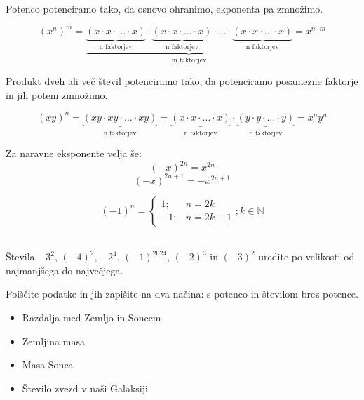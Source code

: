             Potenco potenciramo tako, da osnovo ohranimo, ekponenta pa zmnožimo.

            $$ (x^n)^m=\underbrace{\underbrace{(x\cdot x\cdot\ldots\cdot x)}_\text{n faktorjev}\cdot\underbrace{(x\cdot x\cdot\ldots\cdot x)}_\text{n faktorjev}\cdot\ldots\cdot\underbrace{(x\cdot x\cdot\ldots\cdot x)}_\text{n faktorjev}}_\text{m faktorjev}=x^{n\cdot m}$$
            
    

    
            Produkt dveh ali več števil potenciramo tako, da potenciramo posamezne faktorje in jih potem zmnožimo.

            $$ (xy)^n =\underbrace{(xy\cdot xy\cdot\ldots\cdot xy)}_\text{n faktorjev}=\underbrace{(x\cdot x\cdot\ldots\cdot x)}_\text{n faktorjev}\cdot\underbrace{(y\cdot y\cdot\ldots\cdot y)}_\text{n faktorjev}=x^n y^n$$
            

            Za naravne eksponente velja še:
            $$(-x)^{2n}=x^{2n}$$
            $$(-x)^{2n+1}=-x^{2n+1}$$

            $$(-1)^n=\begin{cases}
                1; &n=2k \\
                -1; &n=2k-1
            \end{cases}; k\in\mathbb{N}$$
\newline ~\newline
            \newpage

            \begin{naloga}
                    Števila $-3^2$, $(-4)^2$, $-2^4$, $(-1)^{2024}$, $(-2)^3$ in $(-3)^2$ uredite po velikosti od najmanjšega do največjega. 
            \end{naloga}

                \begin{naloga}
                    Poiščite podatke in jih zapišite na dva načina: s potenco in številom brez potence.
                    \begin{itemize}
                        \item Razdalja med Zemljo in Soncem
                        \item Zemljina masa
                        \item Masa Sonca
                        \item Število zvezd v naši Galaksiji
                    \end{itemize}
                \end{naloga}
    

